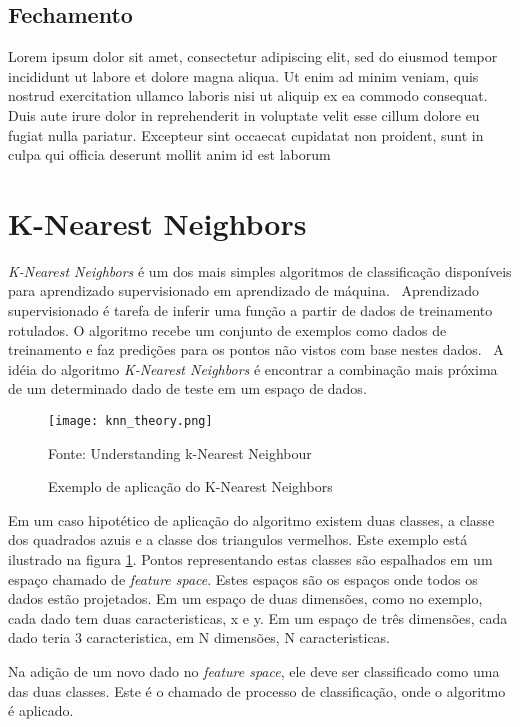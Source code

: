 \subsection{Fechamento}
\label{sec:fechamento}

Lorem ipsum dolor sit amet, consectetur adipiscing elit, sed do eiusmod tempor incididunt ut labore et dolore magna aliqua. Ut enim ad minim veniam, quis nostrud exercitation ullamco laboris nisi ut aliquip ex ea commodo consequat. Duis aute irure dolor in reprehenderit in voluptate velit esse cillum dolore eu fugiat nulla pariatur. Excepteur sint occaecat cupidatat non proident, sunt in culpa qui officia deserunt mollit anim id est laborum

\section{K-Nearest Neighbors}
\label{sec:knearest}

\emph{K-Nearest Neighbors} é um dos mais simples algoritmos de classificação disponíveis para aprendizado supervisionado em aprendizado de máquina.~\cite{opencv2014knearest} Aprendizado supervisionado é tarefa de inferir uma função a partir de dados de treinamento rotulados. O algoritmo recebe um conjunto de exemplos como dados de treinamento e faz predições para os pontos não vistos com base nestes dados.~\cite{mohri2012foundations} A idéia do algoritmo \emph{K-Nearest Neighbors} é encontrar a combinação mais próxima de um determinado dado de teste em um espaço de dados.~\cite{opencv2014knearest}

\begin{figure}[H]
	\centering
	\texttt{[image: knn\_theory.png]}
	\caption{Exemplo de aplicação do K-Nearest Neighbors}
Fonte: Understanding k-Nearest Neighbour~\cite{opencv2014knearest}
	\label{fig:knearest_example}
\end{figure}

Em um caso hipotético de aplicação do algoritmo existem duas classes, a classe dos quadrados azuis e a classe dos triangulos vermelhos. Este exemplo está ilustrado na figura \ref{fig:knearest_example}. Pontos representando estas classes são espalhados em um espaço chamado de \emph{feature space}. Estes espaços são os espaços onde todos os dados estão projetados. Em um espaço de duas dimensões, como no exemplo, cada dado tem duas caracteristicas, x e y. Em um espaço de três dimensões, cada dado teria 3 caracteristica, em N dimensões, N caracteristicas.

Na adição de um novo dado no \emph{feature space}, ele deve ser classificado como uma das duas classes. Este é o chamado de processo de classificação, onde o algoritmo é aplicado.

